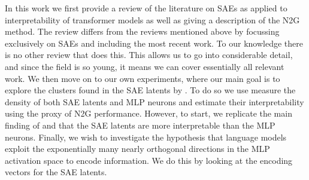In this work we first provide a review of the literature on SAEs as applied to interpretability of transformer models as well as giving a description of the N2G method.
The review differs from the reviews mentioned above by focussing exclusively on SAEs and including the most recent work.
To our knowledge there is no other review that does this.
This allows us to go into considerable detail, and since the field is so young, it means we can cover essentially all relevant work.
We then move on to our own experiments, where our main goal is to explore the clusters found in the SAE latents by \textcite{bricken_towards_2023}.
To do so we use measure the density of both SAE latents and MLP neurons and estimate their interpretability using the proxy of N2G performance.
However, to start, we replicate the main finding of \textcite{bricken_towards_2023} and \textcite{cunningham_sparse_2023} that the SAE latents are more interpretable than the MLP neurons.
Finally, we wish to investigate the hypothesis that language models exploit the exponentially many nearly orthogonal directions in the MLP activation space to encode information.
We do this by looking at the encoding vectors for the SAE latents.
